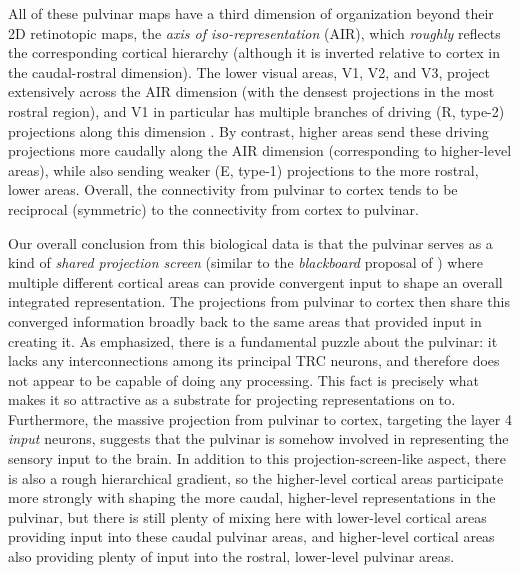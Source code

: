 \documentclass[11pt,twoside]{article}
\newif\myifpdf
\begin{document}
All of these pulvinar maps have a third dimension of organization beyond their 2D retinotopic maps, the {\em axis of iso-representation} (AIR), which {\em roughly} reflects the corresponding cortical hierarchy (although it is inverted relative to cortex in the caudal-rostral dimension).  The lower visual areas, V1, V2, and V3, project extensively across the AIR dimension (with the densest projections in the most rostral region), and V1 in particular has multiple branches of driving (R, type-2) projections along this dimension \cite{Rockland98a,Rockland96,ShermanGuillery06}.  By contrast, higher areas send these driving projections more caudally along the AIR dimension (corresponding to higher-level areas), while also sending weaker (E, type-1) projections to the more rostral, lower areas.  Overall, the connectivity from pulvinar to cortex tends to be reciprocal (symmetric) to the connectivity from cortex to pulvinar.

Our overall conclusion from this biological data is that the pulvinar serves as a kind of {\em shared projection screen} (similar to the {\em blackboard} proposal of ) where multiple different cortical areas can provide convergent input to shape an overall integrated representation.  The projections from pulvinar to cortex then share this converged information broadly back to the same areas that provided input in creating it.  As  emphasized, there is a fundamental puzzle about the pulvinar: it lacks any interconnections among its principal TRC neurons, and therefore does not appear to be capable of doing any processing.  This fact is precisely what makes it so attractive as a substrate for projecting representations on to.  Furthermore, the massive projection from pulvinar to cortex, targeting the layer 4 {\em input} neurons, suggests that the pulvinar is somehow involved in representing the sensory input to the brain.  In addition to this projection-screen-like aspect, there is also a rough hierarchical gradient, so the higher-level cortical areas participate more strongly with shaping the more caudal, higher-level representations in the pulvinar, but there is still plenty of mixing here with lower-level cortical areas providing input into these caudal pulvinar areas, and higher-level cortical areas also providing plenty of input into the rostral, lower-level pulvinar areas.
\end{document}
